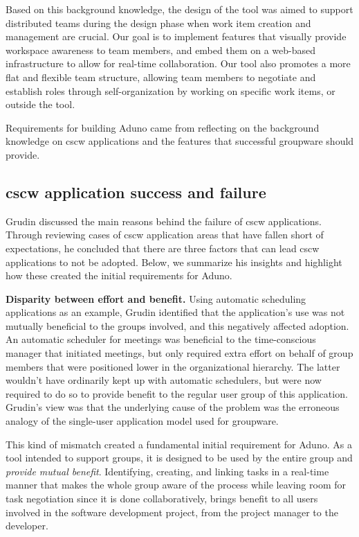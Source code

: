 \documentclass[conference]{IEEEtran}
\begin{document}
Based on this background knowledge, the design of the tool was aimed to support distributed teams during the design phase when work item creation and management are crucial. Our goal is to implement features that visually provide workspace awareness to team members, and embed them on a web-based infrastructure to allow for real-time collaboration. Our tool also promotes a more flat and flexible team structure, allowing team members to negotiate and establish roles through self-organization by working on specific work items, or outside the tool.

Requirements for building Aduno came from reflecting on the background knowledge on {\sc cscw} applications and the features that successful groupware should provide. 


\subsection{{\sc cscw} application success and failure}
Grudin \cite{Grudin88} discussed the main reasons behind the failure of {\sc cscw} applications. Through reviewing cases of {\sc cscw} application areas that have fallen short of expectations, he concluded that there are three factors that can lead {\sc cscw} applications to not be adopted. Below, we summarize his insights and highlight how these created the initial requirements for Aduno.

\textbf{Disparity between effort and benefit.} Using automatic scheduling applications as an example, Grudin identified that the application's use was not mutually beneficial to the groups involved, and this negatively affected adoption. An automatic scheduler for meetings was beneficial to the time-conscious manager that initiated meetings, but only required extra effort on behalf of group members that were positioned lower in the organizational hierarchy. The latter wouldn't have ordinarily kept up with automatic schedulers, but were now required to do so to provide benefit to the regular user group of this application. Grudin's view was that the underlying cause of the problem was the erroneous analogy of the single-user application model used for groupware.

This kind of mismatch created a fundamental initial requirement for Aduno. As a tool intended to support groups, it is designed to be used by the entire group and \textit{provide mutual benefit}. Identifying, creating, and linking tasks in a real-time manner that makes the whole group aware of the process while leaving room for task negotiation since it is done collaboratively, brings benefit to all users involved in the software development project, from the project manager to the developer.
\end{document}
